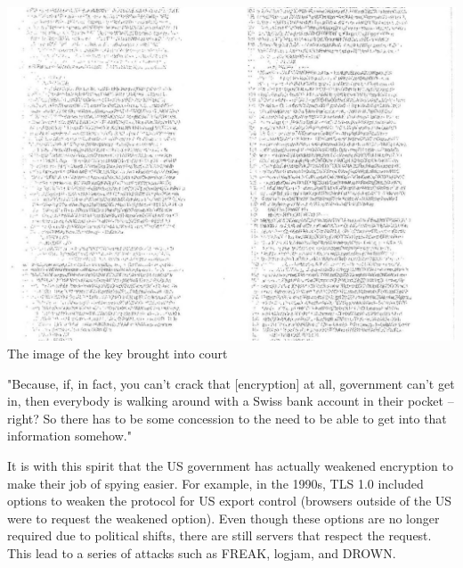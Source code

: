 \documentclass[11pt]{article} %
\begin{document}
\begin{center}
\includegraphics[scale=.3]{./lavabit-blurry-key.png}
\\The image of the key brought into court
\end{center}

"Because, if, in fact, you can’t crack that [encryption] at all, government can’t get in, then everybody is walking around with a Swiss bank account in their pocket – right? So there has to be some concession to the need to be able to get into that information somehow."


It is with this spirit that the US government has actually weakened encryption to make their job of spying easier. For example, in the 1990s, TLS 1.0 included options to weaken the protocol for US export control (browsers outside of the US were to request the weakened option). Even though these options are no longer required due to political shifts, there are still servers that respect the request. This lead to a series of attacks such as FREAK, logjam, and DROWN. 
\end{document}
